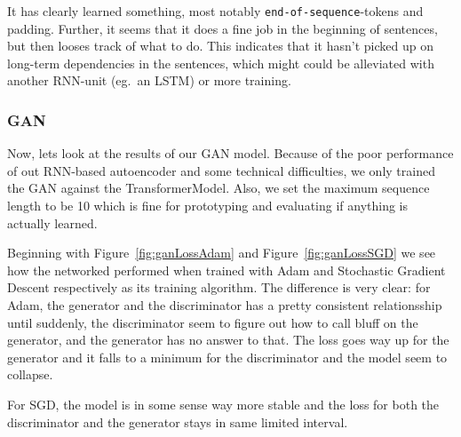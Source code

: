 \documentclass{article}
\begin{document}
It has clearly learned something, most notably \texttt{end-of-sequence}-tokens
and padding. Further, it seems that it does a fine job in the beginning of
sentences, but then looses track of what to do. This indicates that it hasn't
picked up on long-term dependencies in the sentences, which might could be
alleviated with another RNN-unit (eg.\ an LSTM) or more training.

\subsubsection{GAN}

Now, lets look at the results of our GAN model. Because of the poor performance
of out RNN-based autoencoder and some technical difficulties, we only trained the
GAN against the TransformerModel. Also, we set the maximum sequence length to be
10 which is fine for prototyping and evaluating if anything is actually learned.

Beginning with Figure~\ref{fig:ganLossAdam} and Figure~\ref{fig:ganLossSGD} we
see how the networked performed when trained with Adam and Stochastic Gradient
Descent respectively as its training algorithm. The difference is very clear:
for Adam, the generator and the discriminator has a pretty consistent
relationsship until suddenly, the discriminator seem to figure out how to call
bluff on the generator, and the generator has no answer to that. The loss goes
way up for the generator and it falls to a minimum for the discriminator and the
model seem to collapse.

For SGD, the model is in some sense way more stable and the loss for both the
discriminator and the generator stays in same limited interval. 
\end{document}
